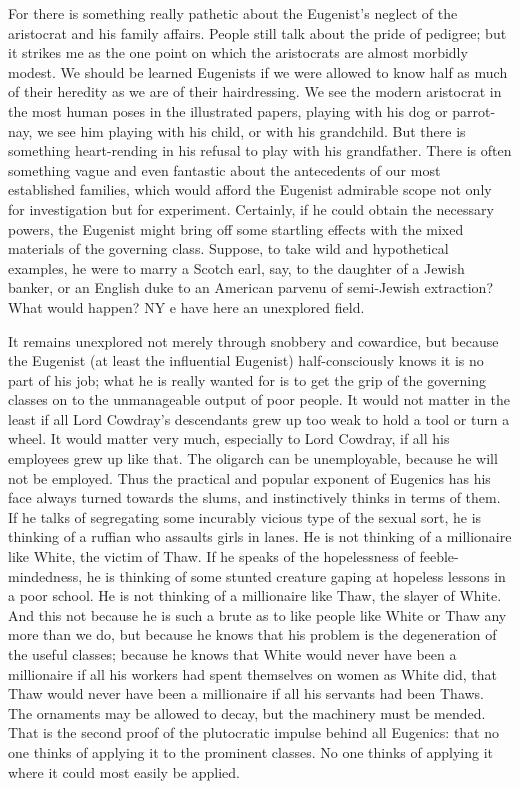 \documentclass{book}
\begin{document}
For there is something really pathetic about the Eugenist’s neglect of the aristocrat and his family affairs. People still talk about the pride of pedigree; but it strikes me as the one point on which the aristocrats are almost morbidly modest. We should be learned Eugenists if we were allowed to know half as much of their heredity as we are of their hairdressing. We see the modern aristocrat in the most human poses in the illustrated papers, playing with his dog or parrot-nay, we see him playing with his child, or with his grandchild. But there is something heart-rending in his refusal to play with his grandfather. There is often something vague and even fantastic about the antecedents of our most established families, which would afford the Eugenist admirable scope not only for investigation but for experiment. Certainly, if he could obtain the necessary powers, the Eugenist might bring off some startling effects with the mixed materials of the governing class. Suppose, to take wild and hypothetical examples, he were to marry a Scotch earl, say, to the daughter of a Jewish banker, or an English duke to an American parvenu of semi-Jewish extraction? What would happen? NY e have here an unexplored field.

It remains unexplored not merely through snobbery and cowardice, but because the Eugenist (at least the influential Eugenist) half-consciously knows it is no part of his job; what he is really wanted for is to get the grip of the governing classes on to the unmanageable output of poor people. It would not matter in the least if all Lord Cowdray’s descendants grew up too weak to hold a tool or turn a wheel. It would matter very much, especially to Lord Cowdray, if all his employees grew up like that. The oligarch can be unemployable, because he will not be employed. Thus the practical and popular exponent of Eugenics has his face always turned towards the slums, and instinctively thinks in terms of them. If he talks of segregating some incurably vicious type of the sexual sort, he is thinking of a ruffian who assaults girls in lanes. He is not thinking of a millionaire like White, the victim of Thaw. If he speaks of the hopelessness of feeble-mindedness, he is thinking of some stunted creature gaping at hopeless lessons in a poor school. He is not thinking of a millionaire like Thaw, the slayer of White. And this not because he is such a brute as to like people like White or Thaw any more than we do, but because he knows that his problem is the degeneration of the useful classes; because he knows that White would never have been a millionaire if all his workers had spent themselves on women as White did, that Thaw would never have been a millionaire if all his servants had been Thaws. The ornaments may be allowed to decay, but the machinery must be mended. That is the second proof of the plutocratic impulse behind all Eugenics: that no one thinks of applying it to the prominent classes. No one thinks of applying it where it could most easily be applied.
\end{document}
